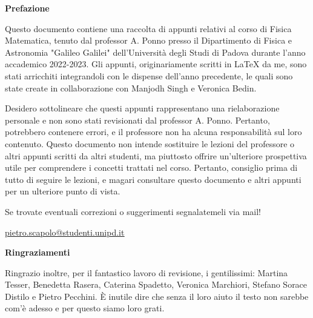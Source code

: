 \documentclass[Main.tex]{subfiles}
\begin{document}
\begin{center}
\begin{LARGE}{\textbf{Prefazione}}\end{LARGE} \bigskip

Questo documento contiene una raccolta di appunti relativi al corso di Fisica Matematica, tenuto dal professor A. Ponno presso il Dipartimento di Fisica e Astronomia "Galileo Galilei" dell'Università degli Studi di Padova durante l'anno accademico 2022-2023. Gli appunti, originariamente scritti in LaTeX da me, sono stati arricchiti integrandoli con le dispense dell'anno precedente, le quali sono state create in collaborazione con Manjodh Singh e Veronica Bedin. 

Desidero sottolineare che questi appunti rappresentano una rielaborazione personale e non sono stati revisionati dal professor A. Ponno. Pertanto, potrebbero contenere errori, e il professore non ha alcuna responsabilità sul loro contenuto. Questo documento non intende sostituire le lezioni del professore o altri appunti scritti da altri studenti, ma piuttosto offrire un'ulteriore prospettiva utile per comprendere i concetti trattati nel corso. Pertanto, consiglio prima di tutto di seguire le lezioni, e magari consultare questo documento e altri appunti per un ulteriore punto di vista.
\newline

Se trovate eventuali correzioni o suggerimenti segnalatemeli via mail!

\href{mailto:pietro.scapolo@studenti.unipd.it}{\underline{ pietro.scapolo@studenti.unipd.it}}

\bigskip
\begin{LARGE}{\textbf{Ringraziamenti}}\end{LARGE} \bigskip

Ringrazio inoltre, per il fantastico lavoro di revisione, i gentilissimi: Martina Tesser, Benedetta Rasera, Caterina Spadetto, Veronica Marchiori, Stefano Sorace Distilo e Pietro Pecchini. È inutile dire che senza il loro aiuto il testo non sarebbe com’è adesso e per questo siamo loro grati.
\end{center}


\indice
\thispagestyle{empty}
\end{document}
